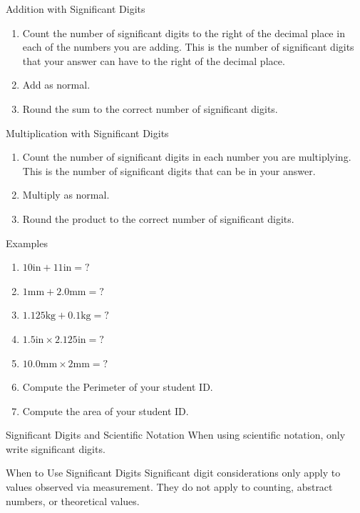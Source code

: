 \documentclass{beamer}
\begin{document}
\begin{frame}{Addition with Significant Digits}
\begin{enumerate}[<+->]
    \item Count the number of significant digits to the right of the decimal place in each of the numbers you are adding. This is the number of significant digits that your answer can have to the right of the decimal place.
    \item Add as normal.
    \item Round the sum to the correct number of significant digits.
\end{enumerate}
\end{frame}


\begin{frame}{Multiplication with Significant Digits}
\begin{enumerate}[<+->]
    \item Count the number of significant digits in each number you are multiplying. This is the number of significant digits that can be in your answer.
    \item Multiply as normal.
    \item Round the product to the correct number of significant digits.
\end{enumerate}
\end{frame}

\begin{frame}{Examples}
\begin{enumerate}
    \item<1-> $10\mathrm{in} + 11\mathrm{in} = ?$
    \item<3-> $1\mathrm{mm} + 2.0\mathrm{mm} = ?$ 
    \item<5-> $1.125\mathrm{kg} + 0.1\mathrm{kg} = ?$
    \item<7-> $1.5\mathrm{in} \times 2.125\mathrm{in} = ?$ 
    \item<9-> $10.0\mathrm{mm} \times 2\mathrm{mm} = ?$
    \item<10-> Compute the Perimeter of your student ID.
    \item<11-> Compute the area of your student ID.
\end{enumerate}
\end{frame}

\begin{frame}{Significant Digits and Scientific Notation}
When using scientific notation, only write significant digits.
\end{frame}

\begin{frame}{When to Use Significant Digits}
Significant digit considerations only apply to values observed via
measurement.  They do not apply to counting, abstract numbers, or
theoretical values.
\end{frame}
\end{document}
